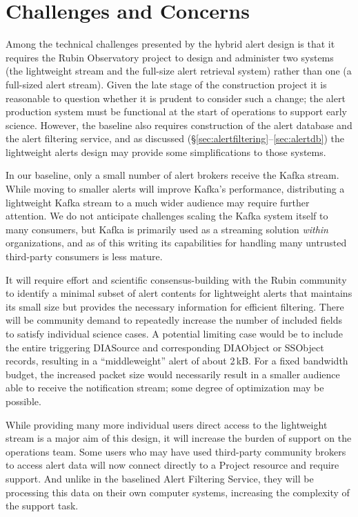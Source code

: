 \documentclass[DM,authoryear,toc]{lsstdoc}
\begin{document}
\section{Challenges and Concerns}
Among the technical challenges presented by the hybrid alert design is that it requires the Rubin Observatory project to design and administer two systems (the lightweight stream and the full-size alert retrieval system) rather than one (a full-sized alert stream).
Given the late stage of the construction project it is reasonable to question whether it is prudent to consider such a change; the alert production system must be functional at the start of operations to support early science.
However, the baseline also requires construction of the alert database and the alert filtering service, and as discussed (\S \ref{sec:alertfiltering}--\ref{sec:alertdb}) the lightweight alerts design may provide some simplifications to those systems.

In our baseline, only a small number of alert brokers receive the Kafka stream.
While moving to smaller alerts will improve Kafka's performance, distributing a lightweight Kafka stream to a much wider audience may require further attention.
We do not anticipate challenges scaling the Kafka system itself to many consumers, but Kafka is primarily used as a streaming solution \textit{within} organizations, and as of this writing its capabilities for handling many untrusted third-party consumers is less mature.

It will require effort and scientific consensus-building with the Rubin community to identify a minimal subset of alert contents for lightweight alerts that maintains its small size but provides the necessary information for efficient filtering.
There will be community demand to repeatedly increase the number of included fields to satisfy individual science cases.
A potential limiting case would be to include the entire triggering DIASource and corresponding DIAObject or SSObject records, resulting in a ``middleweight'' alert of about 2\,kB.
For a fixed bandwidth budget, the increased packet size would necessarily result in a smaller audience able to receive the notification stream; some degree of optimization may be possible.

While providing many more individual users direct access to the lightweight stream is a major aim of this design, it will increase the burden of support on the operations team.
Some users who may have used third-party community brokers to access alert data will now connect directly to a Project resource and require support.
And unlike in the baselined Alert Filtering Service, they will be processing this data on their own computer systems, increasing the complexity of the support task.
\end{document}
